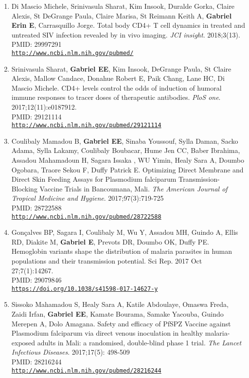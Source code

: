\documentclass[12pt]{article}
\providecommand \url[1]{\href{#1}{#1}}
\renewcommand*\url[1]{\href{#1}{\texttt{#1}}}
\begin{document}
\begin{enumerate}
\item Di Mascio Michele, Srinivasula Sharat, Kim Insook, Duralde Gorka, Claire Alexis, St DeGrange Paula, Claire Marisa, St Reimann Keith A, \textbf{Gabriel Erin E}, Carrasquillo Jorge. Total body CD4+ T cell dynamics in treated and untreated SIV infection revealed by in vivo imaging.  \emph{JCI insight}. 2018;3(13).
PMID: 29997291\\
\url{http://www.ncbi.nlm.nih.gov/pubmed/}


\item Srinivasula Sharat, \textbf{Gabriel EE},  Kim Insook, DeGrange Paula, St Claire Alexis, Mallow  Candace, Donahue  Robert E,  Paik Chang, Lane HC, Di Mascio Michele. CD4+ levels control the odds of induction of humoral immune responses to tracer doses of therapeutic antibodies. \emph{PloS one}. 2017;12(11):e0187912.\\
PMID: 29121114\\
\url{http://www.ncbi.nlm.nih.gov/pubmed/29121114}


\item  Coulibaly Mamadou B,  \textbf{Gabriel EE},  Sinaba Youssouf, Sylla Daman, Sacko Adama, Sylla Lakamy, Coulibaly Boubacar, Hume Jen CC, Baber Ibrahima, Assadou Mahamadoun H,   Sagara  Issaka , WU Yimin,  Healy Sara A, Doumbo Ogobara,  Traore Sekou F, Duffy Patrick E. Optimizing Direct Membrane and Direct Skin Feeding Assays for Plasmodium falciparum Transmission-Blocking Vaccine Trials in Bancoumana, Mali. \emph{The American Journal of Tropical Medicine and Hygiene}. 2017;97(3):719-725\\
PMID: 28722588\\
\url{http://www.ncbi.nlm.nih.gov/pubmed/28722588}



\item Gonçalves BP, Sagara I, Coulibaly M, Wu Y, Assadou MH, Guindo A, Ellis RD, Diakite M, \textbf{Gabriel E}, Prevots DR, Doumbo OK, Duffy PE. Hemoglobin variants shape the distribution of malaria parasites in human populations and their transmission potential. Sci Rep. 2017 Oct 27;7(1):14267.\\
PMID: 29079846\\
\url{https://doi.org/10.1038/s41598-017-14627-y}

\item	Sissoko  Mahamadou S, Healy  Sara A, Katile  Abdoulaye, Omaswa  Freda, Zaidi  Irfan, \textbf{Gabriel  EE}, Kamate  Bourama, Samake  Yacouba, Guindo  Merepen A, Dolo  Amagana.	Safety and efficacy of PfSPZ Vaccine against Plasmodium falciparum via direct venous inoculation in healthy malaria-exposed adults in Mali: a randomised,  double-blind phase 1 trial. \emph{The Lancet Infectious Diseases}. 2017;17(5): 498-509\\
PMID: 28216244\\
\url{http://www.ncbi.nlm.nih.gov/pubmed/28216244}



\end{enumerate}
\end{document}
